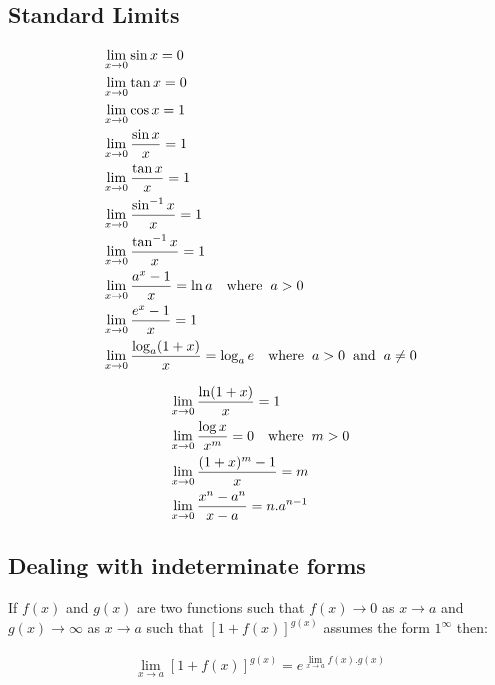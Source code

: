 \subsection{Standard Limits}
\vspace{-1mm}
\begin{align}
&\lim_{x \to 0} \sin x = 0 \\
&\lim_{x \to 0} \tan x = 0 \\
&\lim_{x \to 0} \cos x = 1 \\
&\lim_{x \to 0} \frac{\sin x}{x} = 1 \\
&\lim_{x \to 0} \frac{\tan x}{x} = 1 \\
&\lim_{x \to 0} \frac{\sin^{-1} x}{x} = 1 \\
&\lim_{x \to 0} \frac{\tan^{-1} x}{x} = 1 \\
&\lim_{x \to 0} \frac{a^x - 1}{x} = \ln a \quad \text{where} \hspace{2mm} a>0\\
&\lim_{x \to 0} \frac{e^x - 1}{x} = 1 \\
&\lim_{x \to 0} \frac{\log_a (1+x)}{x} = \log_a e \quad \text{where} \hspace{2mm} a>0 \hspace{2mm} \text{and} \hspace{2mm} a\neq0
\end{align}

\vspace{-2mm}

\begin{align}
&\lim_{x \to 0} \frac{\ln (1+x)}{x} = 1 \\
&\lim_{x \to 0} \frac{\log x}{x^m} = 0 \quad \text{where} \hspace{2mm} m>0 \\
&\lim_{x \to 0} \frac{(1+x)^m - 1}{x} = m \\
&\lim_{x \to 0} \frac{x^n - a^n}{x-a} = n.a^{n-1}
\end{align}

\subsection{Dealing with indeterminate forms}
If $f(x)$ and $g(x)$ are two functions such that $f(x)\rightarrow 0$ as $x \rightarrow a$ and $g(x) \rightarrow \infty$ as $x \rightarrow a$ such that $[1+f(x)]^{g(x)}$ assumes the form $1^\infty$ then:

\vspace{2mm}

\begin{tcolorbox}
\begin{center}
\begin{align*}
\lim_{x \to a}{[1+f(x)]}^{g(x)} = {e} ^ {\lim_{x \to a} f(x) . g(x)} 
\end{align*}
\end{center}
\end{tcolorbox} 

